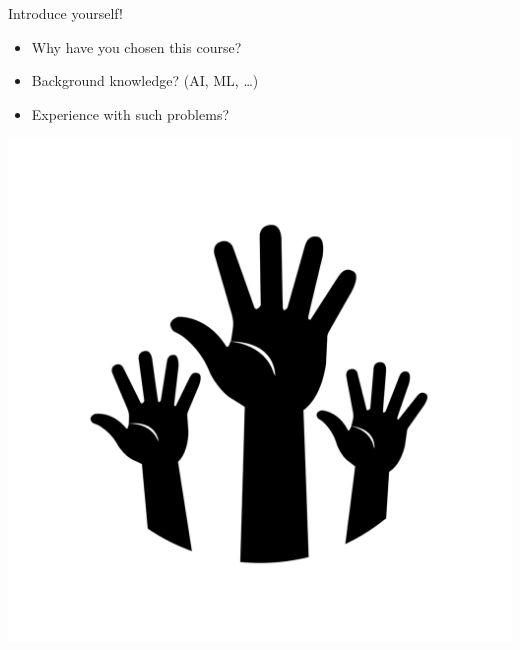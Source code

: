 \begin{frame}[c]{Introduce yourself!}

\begin{itemize}
  \item Why have you chosen this course?
  \medskip
  \item Background knowledge? (AI, ML, \ldots)
  \medskip 
  \item Experience with such problems?
\end{itemize}

\bigskip
\centering
\includegraphics[scale=0.1]{images/hands.png}

\end{frame}
% 
